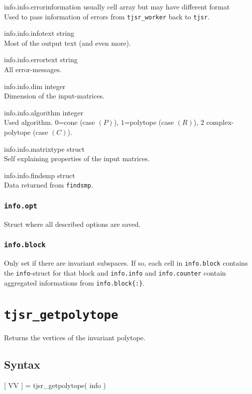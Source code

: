 \begin{param}
\item[info.info.errorinformation] usually cell array but may have different format\\Used to pass information of errors from \texttt{tjsr\_worker} back to \texttt{tjsr}.
\item[info.info.infotext] string\\Most of the output text (and even more).
\item[info.info.errortext] string\\All error-messages.
\item[info.info.dim] integer\\Dimension of the input-matrices.
\item[info.info.algorithm] integer\\Used algorithm. $0$=cone (case $(P)$), $1$=polytope (case $(R)$), $2$ complex-polytope (case $(C)$).
\item[info.info.matrixtype] struct\\Self explaining properties of the input matrices.
\item[info.info.findsmp] struct\\Data returned from \texttt{findsmp}.
\end{param}

\subsubsection{\texttt{info.opt}}
Struct where all described options are saved.

\subsubsection{\texttt{info.block}}
Only set if there are invariant subspaces. If so, each cell in \texttt{info.block} contains the \texttt{info}-struct for that block
and \texttt{info.info} and \texttt{info.counter} contain aggregated informations from \texttt{info.block\{:\}}.

\section{\texttt{tjsr\_getpolytope}}\label{tjsr_getpolytope}
Returns the vertices of the invariant polytope.
\subsection*{Syntax}
\begin{param}
\item[{[ VV ] = tjsr\_getpolytope( info )}]
\end{param}
